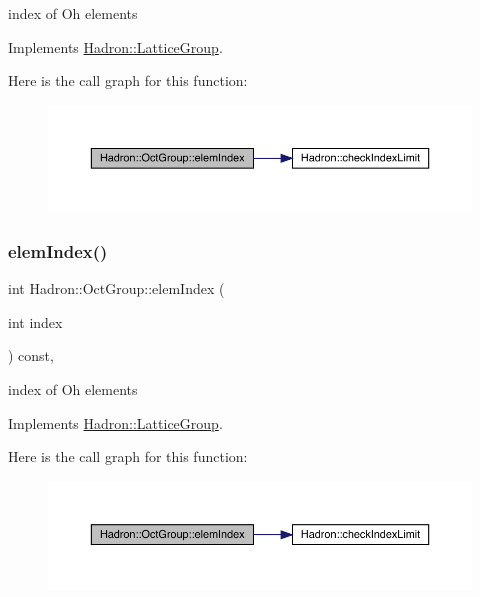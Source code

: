 index of Oh elements 

Implements \mbox{\hyperlink{structHadron_1_1LatticeGroup_afb8e3ee60de059f75bce1044c694e1e8}{Hadron\+::\+Lattice\+Group}}.

Here is the call graph for this function\+:
\nopagebreak
\begin{figure}[H]
\begin{center}
\leavevmode
\includegraphics[width=350pt]{d1/de5/structHadron_1_1OctGroup_a1410a74894e1d12337548245c4e6fd47_cgraph}
\end{center}
\end{figure}
\mbox{\label{structHadron_1_1OctGroup_a1410a74894e1d12337548245c4e6fd47}} 
\subsubsection{\texorpdfstring{elemIndex()}{elemIndex()}\hspace{0.1cm}{\footnotesize\ttfamily [3/3]}}
{\footnotesize\ttfamily int Hadron\+::\+Oct\+Group\+::elem\+Index (\begin{DoxyParamCaption}\item[{int}]{index }\end{DoxyParamCaption}) const\hspace{0.3cm}{\ttfamily [inline]}, {\ttfamily [virtual]}}

index of Oh elements 

Implements \mbox{\hyperlink{structHadron_1_1LatticeGroup_afb8e3ee60de059f75bce1044c694e1e8}{Hadron\+::\+Lattice\+Group}}.

Here is the call graph for this function\+:
\nopagebreak
\begin{figure}[H]
\begin{center}
\leavevmode
\includegraphics[width=350pt]{d1/de5/structHadron_1_1OctGroup_a1410a74894e1d12337548245c4e6fd47_cgraph}
\end{center}
\end{figure}
\mbox{\label{structHadron_1_1OctGroup_a0d21b9bbc5cc2cafa4945e9dd5608a6b}} 
